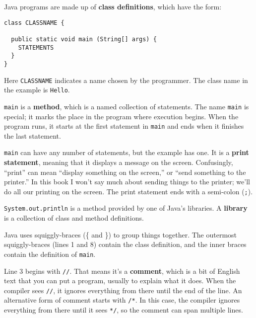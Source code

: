\documentclass[12pt]{book}
\theoremstyle{definition}
\begin{document}
Java programs are made up of {\bf class definitions}, which have
the form:


\begin{lstlisting}
class CLASSNAME {

  public static void main (String[] args) {
    STATEMENTS
  }
}
\end{lstlisting}
%
Here {\tt CLASSNAME} indicates a name chosen by the programmer.
The class name in the example is {\tt Hello}.


{\tt main} is a {\bf method}, which is a named collection of
statements.  The name {\tt main} is special; it marks the place in the
program where execution begins.  When the program runs, it starts at
the first statement in {\tt main} and ends when it finishes the last
statement.


{\tt main} can have any number of statements, but the example has one.
It is a {\bf print statement}, meaning that it displays a message on
the screen.  Confusingly, ``print'' can mean ``display something on
the screen,'' or ``send something to the printer.''  In this book I
won't say much about sending things to the printer; we'll do all our
printing on the screen.  The print statement ends with a semi-colon
({\tt ;}).

{\tt System.out.println} is a method provided by one of Java's
libraries.  A {\bf library} is a collection of class and method
definitions.

Java uses squiggly-braces (\{ and \}) to group things together.  The
outermost squiggly-braces (lines 1 and 8) contain the class
definition, and the inner braces contain the definition of {\tt main}.


Line 3 begins with {\tt //}.  That means it's 
a {\bf comment}, which is a bit of
English text that you can put a program,
usually to explain what it does.  When the compiler
sees {\tt //}, it ignores everything from there until the end
of the line. An alternative form of comment starts with \texttt{/*}.
In this case, the compiler ignores everything from there until it sees
\texttt{*/}, so the comment can span multiple lines.
\end{document}
